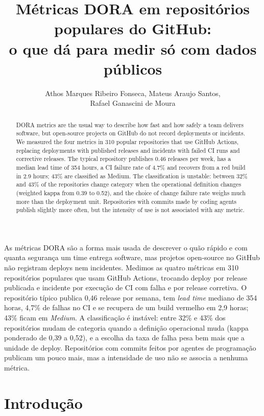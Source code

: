 \documentclass[12pt]{article}
\title{Métricas DORA em repositórios populares do GitHub:\\
o que dá para medir só com dados públicos}
\author{Athos Marques Ribeiro Fonseca\inst{1}, Mateus Araujo Santos\inst{1},\\
Rafael Ganascini de Moura\inst{1}}
\begin{document}
\maketitle

\begin{abstract}
DORA metrics are the usual way to describe how fast and how safely a team delivers software, but
open-source projects on GitHub do not record deployments or incidents. We measured the four metrics
in 310 popular repositories that use GitHub Actions, replacing deployments with published releases
and incidents with failed CI runs and corrective releases. The typical repository publishes 0.46
releases per week, has a median lead time of 354 hours, a CI failure rate of 4.7\% and recovers from
a red build in 2.9 hours; 43\% are classified as Medium. The classification is unstable: between 32\%
and 43\% of the repositories change category when the operational definition changes (weighted
kappa from 0.39 to 0.52), and the choice of change failure rate weighs much more than the deployment
unit. Repositories with commits made by coding agents publish slightly more often, but the intensity
of use is not associated with any metric.
\end{abstract}

\begin{resumo}
As métricas DORA são a forma mais usada de descrever o quão rápido e com quanta segurança um time
entrega software, mas projetos open-source no GitHub não registram deploys nem incidentes. Medimos
as quatro métricas em 310 repositórios populares que usam GitHub Actions, trocando deploy por release
publicada e incidente por execução de CI com falha e por release corretiva. O repositório típico
publica 0,46 release por semana, tem \textit{lead time} mediano de 354 horas, 4,7\% de falhas no CI e
se recupera de um build vermelho em 2,9 horas; 43\% ficam em \textit{Medium}. A classificação é
instável: entre 32\% e 43\% dos repositórios mudam de categoria quando a definição operacional muda
(kappa ponderado de 0,39 a 0,52), e a escolha da taxa de falha pesa bem mais que a unidade de deploy.
Repositórios com commits feitos por agentes de programação publicam um pouco mais, mas a intensidade
de uso não se associa a nenhuma métrica.
\end{resumo}

\section{Introdução}
\end{document}
